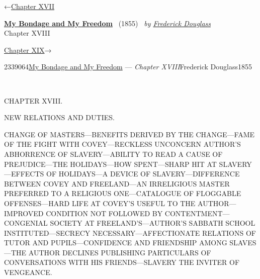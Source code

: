 \hypertarget{headerContainer}{}
\hypertarget{navigationHeader}{}
\protect\hypertarget{headerprevious}{}{←\href{/wiki/My_Bondage_and_My_Freedom_(1855)/Chapter_XVII}{Chapter
XVII}}

\textbf{\protect\hypertarget{header_title_text}{}{\href{/wiki/My_Bondage_and_My_Freedom_(1855)}{My
Bondage and My Freedom}}} ~(1855)~ \emph{by
\href{/wiki/Author:Frederick_Douglass}{\protect\hypertarget{header_author_text}{}{{Frederick
Douglass}}}}\\
\protect\hypertarget{header_section_text}{}{Chapter XVIII}

\protect\hypertarget{headernext}{}{\href{/wiki/My_Bondage_and_My_Freedom_(1855)/Chapter_XIX}{Chapter
XIX}→}

\hypertarget{navigationNotes}{}

\hypertarget{ws-data}{}
\protect\hypertarget{ws-article-id}{}{2339064}\protect\hypertarget{ws-title}{}{\href{/wiki/My_Bondage_and_My_Freedom_(1855)}{My
Bondage and My Freedom} --- \emph{Chapter
XVIII}}\protect\hypertarget{ws-author}{}{Frederick
Douglass}\protect\hypertarget{ws-year}{}{1855}

{\protect\hypertarget{250}{}{}}

~

{CHAPTER XVIII.}

NEW RELATIONS AND DUTIES.

{CHANGE OF MASTERS---BENEFITS DERIVED BY THE CHANGE---FAME OF THE FIGHT
WITH COVEY---RECKLESS UNCONCERN AUTHOR'S ABHORRENCE OF SLAVERY---ABILITY
TO READ A CAUSE OF PREJUDICE---THE HOLIDAYS---HOW SPENT---SHARP HIT AT
SLAVERY---EFFECTS OF HOLIDAYS---A DEVICE OF SLAVERY---DIFFERENCE BETWEEN
COVEY AND FREELAND---AN IRRELIGIOUS MASTER PREFERRED TO A RELIGIOUS
ONE---CATALOGUE OF FLOGGABLE OFFENSES---HARD LIFE AT COVEY'S USEFUL TO
THE AUTHOR---IMPROVED CONDITION NOT FOLLOWED BY CONTENTMENT---CONGENIAL
SOCIETY AT FREELAND'S---AUTHOR'S SABBATH SCHOOL INSTITUTED---SECRECY
NECESSARY---AFFECTIONATE RELATIONS OF TUTOR AND PUPILS---CONFIDENCE AND
FRIENDSHIP AMONG SLAVES---THE AUTHOR DECLINES PUBLISHING PARTICULARS OF
CONVERSATIONS WITH HIS FRIENDS---SLAVERY THE INVITER OF VENGEANCE.}


